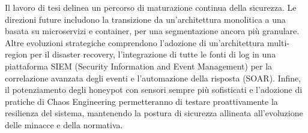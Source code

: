 \documentclass[a4paper,12pt]{article}
\begin{document}
\noindent
Il lavoro di tesi delinea un percorso di maturazione continua della sicurezza. Le direzioni future includono la transizione da un'architettura monolitica a una basata su microservizi e container, per una segmentazione ancora più granulare. Altre evoluzioni strategiche comprendono l'adozione di un'architettura multi-region per il disaster recovery, l'integrazione di tutte le fonti di log in una piattaforma SIEM (Security Information and Event Management) per la correlazione avanzata degli eventi e l'automazione della risposta (SOAR). Infine, il potenziamento degli honeypot con sensori sempre più sofisticati e l'adozione di pratiche di Chaos Engineering permetteranno di testare proattivamente la resilienza del sistema, mantenendo la postura di sicurezza allineata all'evoluzione delle minacce e della normativa.
\end{document}
